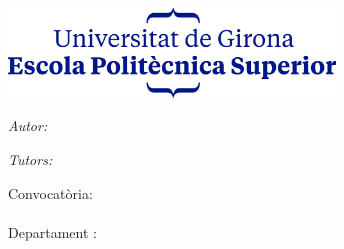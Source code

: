 

\begin{titlepage}

\setlength{\parskip}{0pt}

\begin{center}
\includegraphics[width=0.65\textwidth]{Figures/EPS_centrat.png}

\vspace{2cm}

{\Large \studyprog\par}                      %
\vspace{0.2cm}
\vspace{3.5cm}                            
\textsc{\Large \ttype}                                 %
\vspace{0.2cm}

\HRule 
\vspace{0.4cm}
{\huge \bfseries \ttitle\par}                          %
\vspace{0.4cm}  
\HRule
\vspace{1cm}
 
\begin{minipage}[t]{0.4\textwidth}
\begin{flushleft} 
    \large
    \emph{Autor:}\\
    \authorname
\end{flushleft}
\end{minipage}
\begin{minipage}[t]{0.4\textwidth}
\begin{flushright} 
    \large
    \emph{Tutors:} \\
    \supnameA
\end{flushright}
\end{minipage}

\vspace{2.5cm}
 \textsc{\Large \tdocument}                                 %
\vspace{0.2cm}

\vfill

{\large
Convocatòria:\\                                %
\tdate\\
\vspace{1.5cm}
Departament :\\
\deptname\\                                    %
}
\vfill
\end{center}
\end{titlepage}
\restoregeometry
